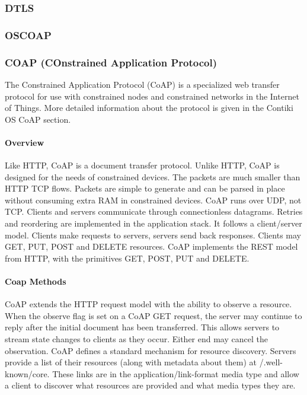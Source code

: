 \subsubsection{DTLS}
\subsubsection{OSCOAP}

\subsubsection{COAP (COnstrained Application Protocol)}

The Constrained Application Protocol (CoAP) is a specialized web transfer protocol for use with constrained nodes and constrained networks in the Internet of Things.
More detailed information about the protocol is given in the Contiki OS CoAP section.

\paragraph{Overview}
Like HTTP,
	CoAP is a document transfer protocol.
Unlike HTTP,
	CoAP is designed for the needs of constrained devices.
The packets are much smaller than HTTP TCP flows.
Packets are simple to generate and can be parsed in place without consuming extra RAM in constrained devices.
CoAP runs over UDP,
	not TCP.
Clients and servers communicate through connectionless datagrams.
Retries and reordering are implemented in the application stack.
It follows a client/server model.
Clients make requests to servers,
	servers send back responses.
Clients may GET,
	PUT,
	POST and DELETE resources.
CoAP implements the REST model from HTTP,
	with the primitives GET,
	POST,
	PUT and DELETE.

\paragraph{Coap Methods}
CoAP extends the HTTP request model with the ability to observe a resource.
When the observe flag is set on a CoAP GET request,
	the server may continue to reply after the initial document has been transferred. This allows servers to stream state
	changes to clients as they occur. Either end may cancel the observation.
	CoAP defines a standard mechanism for resource discovery. Servers provide a list
	of their resources (along with metadata about them) at /.well-known/core. These links
	are in the application/link-format media type and allow a client to discover what
	resources are provided and what media types they are.

